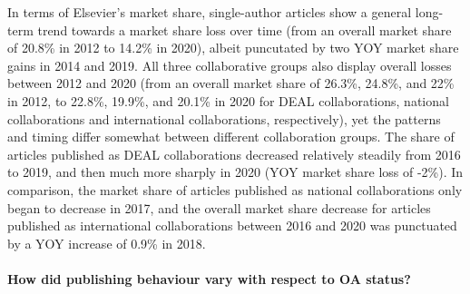 \documentclass[
]{article}
\begin{document}
In terms of Elsevier's market share, single-author articles show a general long-term trend towards a market share loss over time (from an overall market share of 20.8\% in 2012 to 14.2\% in 2020), albeit puncutated by two YOY market share gains in 2014 and 2019. All three collaborative groups also display overall losses between 2012 and 2020 (from an overall market share of 26.3\%, 24.8\%, and 22\% in 2012, to 22.8\%, 19.9\%, and 20.1\% in 2020 for DEAL collaborations, national collaborations and international collaborations, respectively), yet the patterns and timing differ somewhat between different collaboration groups. The share of articles published as DEAL collaborations decreased relatively steadily from 2016 to 2019, and then much more sharply in 2020 (YOY market share loss of -2\%). In comparison, the market share of articles published as national collaborations only began to decrease in 2017, and the overall market share decrease for articles published as international collaborations between 2016 and 2020 was punctuated by a YOY increase of 0.9\% in 2018.

\hypertarget{how-did-publishing-behaviour-vary-with-respect-to-oa-status}{%
\paragraph{How did publishing behaviour vary with respect to OA status?}\label{how-did-publishing-behaviour-vary-with-respect-to-oa-status}}
\end{document}
